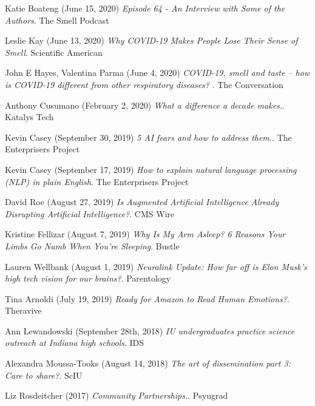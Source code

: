 \documentclass[10pt]{cooperCV2}
\begin{document}
\begin{etaremune}[itemindent=-1.5\bibhang, topsep=0pt,
				   itemsep=\bibsep,partopsep=0pt,parsep=0pt,leftmargin={\bibhang+\widthof{[999]}}]
	
    \item Katie Boateng (June 15, 2020) \textit{Episode 64 - An Interview with Some of the Authors}. The Smell Podcast
     
	
    \item Leslie Kay (June 13, 2020) \textit{Why COVID-19 Makes People Lose Their Sense of Smell}. Scientific American
     
	
    \item John E Hayes, Valentina Parma (June 4, 2020) \textit{COVID-19, smell and taste – how is COVID-19 different from other respiratory diseases? }. The Conversation
     
	
    \item Anthony Cusumano (February 2, 2020) \textit{What a difference a decade makes.}. Katalys Tech
     
	
    \item Kevin Casey (September 30, 2019) \textit{5 AI fears and how to address them.}. The Enterprisers Project
     
	
    \item Kevin Casey (September 17, 2019) \textit{How to explain natural language processing (NLP) in plain English}. The Enterprisers Project
     
	
    \item David Roe (August 27, 2019) \textit{Is Augmented Artificial Intelligence Already Disrupting Artificial Intelligence?}. CMS Wire
     
	
    \item Kristine Fellizar (August 7, 2019) \textit{Why Is My Arm Asleep? 6 Reasons Your Limbs Go Numb When You're Sleeping}. Bustle
     
	
    \item Lauren Wellbank (August 1, 2019) \textit{Neuralink Update: How far off is Elon Musk’s high tech vision for our brains?}. Parentology
     
	
    \item Tina Arnoldi (July 19, 2019) \textit{Ready for Amazon to Read Human Emotions?}. Theravive
     
	
    \item Ann Lewandowski (September 28th, 2018) \textit{IU undergraduates practice science outreach at Indiana high schools}. IDS
     
	
    \item Alexandra Moussa-Tooks (August 14, 2018) \textit{The art of dissemination part 3: Care to share?}. ScIU
     
	
    \item Liz Rosdeitcher (2017) \textit{Community Partnerships.}. Psyugrad
     
	


\end{etaremune}
\end{document}

